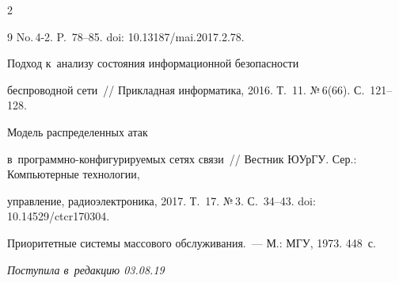 \begin{multicols}{2}
{{\begin{thebibliography}{9}
No.\,4-2. P.~78--85. doi: 10.13187/mai.2017.2.78.





  




   Подход к~анализу состояния информационной безопасности 


беспроводной сети~// Прикладная информатика, 2016. Т.~11. №\,6(66). С.~121--128.







   Модель распределенных атак 


  в~программно-конфигурируемых сетях связи~// Вестник ЮУрГУ. Сер.: Компьютерные технологии, 


управление, радиоэлектроника, 2017. Т.~17. №\,3. С.~34--43. doi: 10.14529/ctcr170304.









Приоритетные системы массового обслуживания.~--- М.: МГУ, 1973. 448~с.


 \end{thebibliography}





 }


 }





\end{multicols}





\vspace*{-3pt}





\hfill{\small\textit{Поступила в~редакцию 03.08.19}}





\vspace*{8pt}





